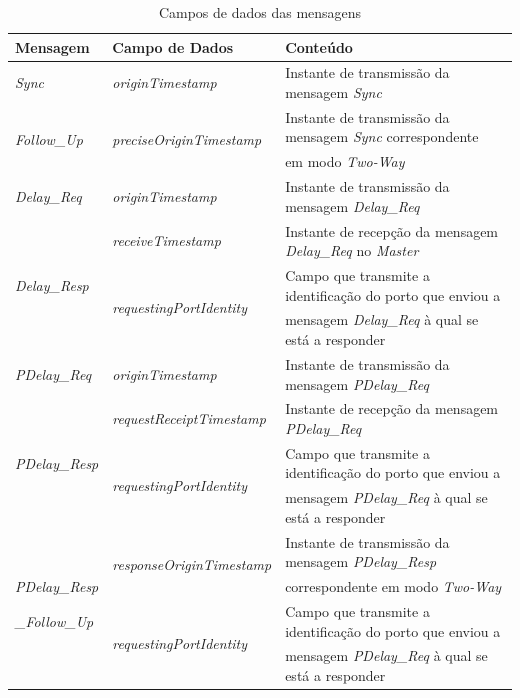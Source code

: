 \begin{table} [H]
\begin{center}
\begin{tabular}{|l| l|l|}

    \hline
    Mensagem & Campo de Dados & Conteúdo \\
    \hline
     \textit{Sync} & \textit{originTimestamp} & Instante de transmissão da mensagem \textit{Sync} \\
    \hline
    \multirow{2}{*}{\textit{Follow\_Up}} & \multirow{2}{*}{\textit{preciseOriginTimestamp}} & Instante de transmissão da mensagem \textit{Sync} correspondente  \\
    & & em modo \textit{Two-Way} \\
    \hline
    \textit{Delay\_Req} & \textit{originTimestamp} & Instante de transmissão da mensagem \textit{Delay\_Req} \\
    \hline
    \multirow{3}{*}{\textit{Delay\_Resp}} & \textit{receiveTimestamp} & Instante de recepção
    da mensagem \textit{Delay\_Req} no \textit{Master}\\
    \cline{2-3}
    & \multirow{2}{*}{\textit{requestingPortIdentity}}  &  Campo que transmite a identificação do porto que enviou a \\
    &   &  mensagem \textit{Delay\_Req} à qual se está a responder\\
    \hline
    \textit{PDelay\_Req} & \textit{originTimestamp} & Instante de transmissão da mensagem \textit{PDelay\_Req} \\
    \hline
     \multirow{3}{*}{\textit{PDelay\_Resp}} & \textit{requestReceiptTimestamp} & Instante de recepção
    da mensagem \textit{PDelay\_Req} \\
    \cline{2-3}
    & \multirow{2}{*}{\textit{requestingPortIdentity}}  &  Campo que transmite a identificação do porto que enviou a \\
    &   &  mensagem \textit{PDelay\_Req} à qual se está a responder\\
    \hline
    & \multirow{2}{*}{\textit{responseOriginTimestamp}} & Instante de transmissão da mensagem \textit{PDelay\_Resp}  \\
    \textit{PDelay\_Resp}& & correspondente em modo \textit{Two-Way} \\
    \cline{2-3}
    \textit{\_Follow\_Up}& \multirow{2}{*}{\textit{requestingPortIdentity}}  &  Campo que transmite a identificação do porto que enviou a \\
    &   &  mensagem \textit{PDelay\_Req} à qual se está a responder\\
    \hline
    
    \hline
\end{tabular}
\end{center}
\caption{Campos de dados das mensagens}\label{Campos de dados das mensagens}
\end{table}


